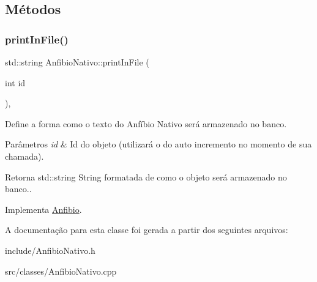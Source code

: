 \subsection{Métodos}
\mbox{\label{classAnfibioNativo_a7926e1af44542ee268e27dd3d862f583}} 
\subsubsection{\texorpdfstring{print\+In\+File()}{printInFile()}}
{\footnotesize\ttfamily std\+::string Anfibio\+Nativo\+::print\+In\+File (\begin{DoxyParamCaption}\item[{int}]{id }\end{DoxyParamCaption})\hspace{0.3cm}{\ttfamily [protected]}, {\ttfamily [virtual]}}



Define a forma como o texto do Anfíbio Nativo será armazenado no banco. 


\begin{DoxyParams}{Parâmetros}
{\em id} & Id do objeto (utilizará o do auto incremento no momento de sua chamada). \\
\hline
\end{DoxyParams}
\begin{DoxyReturn}{Retorna}
std\+::string String formatada de como o objeto será armazenado no banco.. 
\end{DoxyReturn}


Implementa \hyperlink{classAnfibio_ab866ca21fb00c2d4d571aadd271eadec}{Anfibio}.



A documentação para esta classe foi gerada a partir dos seguintes arquivos\+:\begin{DoxyCompactItemize}
\item 
include/Anfibio\+Nativo.\+h\item 
src/classes/Anfibio\+Nativo.\+cpp\end{DoxyCompactItemize}
